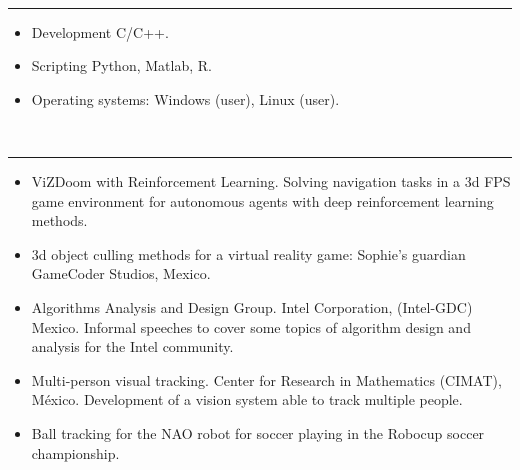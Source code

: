 \documentclass[10 pt]{article}
\newcommand{\mypartitle}[2][2.]{\vspace*{-#1 ex}~\\{\noindent {\bf #2}}}
\begin{document}
\medskip
\medskip

\mypartitle{Skills}
\medskip
\hrule
\medskip

\begin{itemize}[noitemsep]
\item Development C/C++.
\item Scripting Python,  Matlab, R.
\item Operating systems: Windows (user), Linux (user).
\end{itemize}

\medskip
\medskip


\mypartitle{Projects}
\medskip
\hrule
\medskip

\begin{itemize}[noitemsep]


\item ViZDoom with Reinforcement Learning. Solving navigation tasks in a 3d FPS game 
environment for autonomous agents with deep reinforcement learning methods.

\item 3d object culling methods for a virtual reality game: Sophie's guardian GameCoder Studios, Mexico.

\item Algorithms Analysis and Design Group. Intel Corporation, (Intel-GDC) Mexico. 
Informal speeches to cover some topics of algorithm design and analysis for the Intel community.


\item Multi-person visual tracking. Center for Research in Mathematics (CIMAT), México. 
Development of a vision system able to track multiple people.

\item Ball tracking for the NAO robot for soccer playing in the Robocup soccer championship.



\end{itemize}
\end{document}
